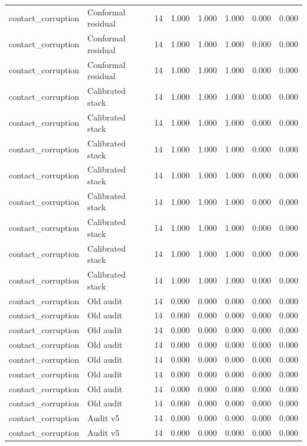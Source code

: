 {\begin{longtable}{llrrrrrr}
contact\_corruption & Conformal residual & 14 & 1.000 & 1.000 & 1.000 & 0.000 & 0.000 \\
contact\_corruption & Conformal residual & 14 & 1.000 & 1.000 & 1.000 & 0.000 & 0.000 \\
contact\_corruption & Conformal residual & 14 & 1.000 & 1.000 & 1.000 & 0.000 & 0.000 \\
contact\_corruption & Calibrated stack & 14 & 1.000 & 1.000 & 1.000 & 0.000 & 0.000 \\
contact\_corruption & Calibrated stack & 14 & 1.000 & 1.000 & 1.000 & 0.000 & 0.000 \\
contact\_corruption & Calibrated stack & 14 & 1.000 & 1.000 & 1.000 & 0.000 & 0.000 \\
contact\_corruption & Calibrated stack & 14 & 1.000 & 1.000 & 1.000 & 0.000 & 0.000 \\
contact\_corruption & Calibrated stack & 14 & 1.000 & 1.000 & 1.000 & 0.000 & 0.000 \\
contact\_corruption & Calibrated stack & 14 & 1.000 & 1.000 & 1.000 & 0.000 & 0.000 \\
contact\_corruption & Calibrated stack & 14 & 1.000 & 1.000 & 1.000 & 0.000 & 0.000 \\
contact\_corruption & Calibrated stack & 14 & 1.000 & 1.000 & 1.000 & 0.000 & 0.000 \\
contact\_corruption & Old audit & 14 & 0.000 & 0.000 & 0.000 & 0.000 & 0.000 \\
contact\_corruption & Old audit & 14 & 0.000 & 0.000 & 0.000 & 0.000 & 0.000 \\
contact\_corruption & Old audit & 14 & 0.000 & 0.000 & 0.000 & 0.000 & 0.000 \\
contact\_corruption & Old audit & 14 & 0.000 & 0.000 & 0.000 & 0.000 & 0.000 \\
contact\_corruption & Old audit & 14 & 0.000 & 0.000 & 0.000 & 0.000 & 0.000 \\
contact\_corruption & Old audit & 14 & 0.000 & 0.000 & 0.000 & 0.000 & 0.000 \\
contact\_corruption & Old audit & 14 & 0.000 & 0.000 & 0.000 & 0.000 & 0.000 \\
contact\_corruption & Old audit & 14 & 0.000 & 0.000 & 0.000 & 0.000 & 0.000 \\
contact\_corruption & Audit v5 & 14 & 0.000 & 0.000 & 0.000 & 0.000 & 0.000 \\
contact\_corruption & Audit v5 & 14 & 0.000 & 0.000 & 0.000 & 0.000 & 0.000 \\

\end{longtable}}
